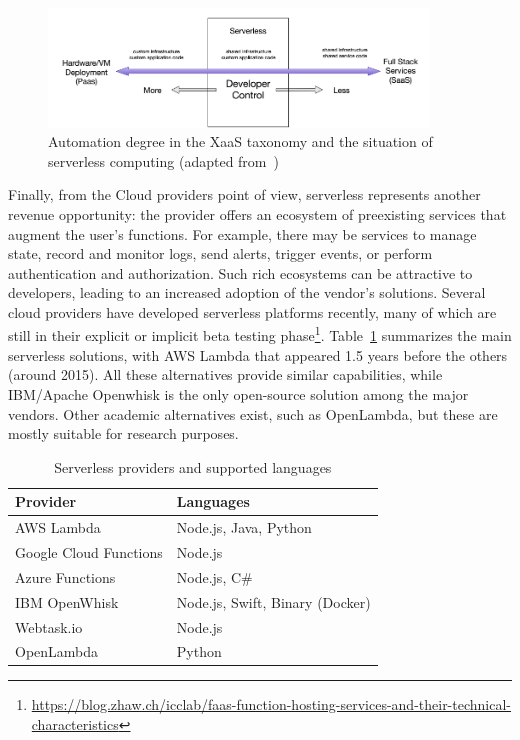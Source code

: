 \begin{figure}[tbp]
	\includegraphics[width=0.9\textwidth]{figs/DeveloperControl.png}
	\caption{Automation degree in the XaaS taxonomy and the situation of serverless computing (adapted from~\cite{baldini2017serverless})}
	\label{fig:developer-control-serverless}
\end{figure}


Finally, from the Cloud providers point of view, serverless represents another revenue opportunity: the provider offers an ecosystem of preexisting services that augment the user's functions. For example, there may be services to manage state, record and monitor logs, send alerts, trigger events, or perform authentication and authorization. Such rich ecosystems can be attractive to developers, leading to an increased adoption of the vendor's solutions. Several cloud providers have developed serverless platforms recently, many of which are still in their explicit or implicit beta testing phase\footnote{\url{https://blog.zhaw.ch/icclab/faas-function-hosting-services-and-their-technical-characteristics}}. Table~\ref{tab:FaaS-providers-and} summarizes the main serverless solutions, with AWS Lambda that appeared 1.5 years before the others (around 2015). All these alternatives provide similar capabilities, while IBM/Apache Openwhisk is the only open-source solution among the major vendors. Other academic alternatives exist, such as OpenLambda\cite{hendrickson2016serverless}, but these are mostly suitable for research purposes.

\begin{table}[hbt]
\centering
\caption{Serverless providers and supported languages\label{tab:FaaS-providers-and}}{
\begin{tabular}{ll}
\toprule 
\textbf{Provider} & \textbf{Languages}\tabularnewline
\midrule
AWS Lambda & Node.js, Java, Python\tabularnewline
Google Cloud Functions & Node.js\tabularnewline
Azure Functions & Node.js, C\#\tabularnewline
IBM OpenWhisk & Node.js, Swift, Binary (Docker)\tabularnewline
Webtask.io & Node.js\tabularnewline
OpenLambda & Python\tabularnewline
\bottomrule
\end{tabular}}
\end{table}





